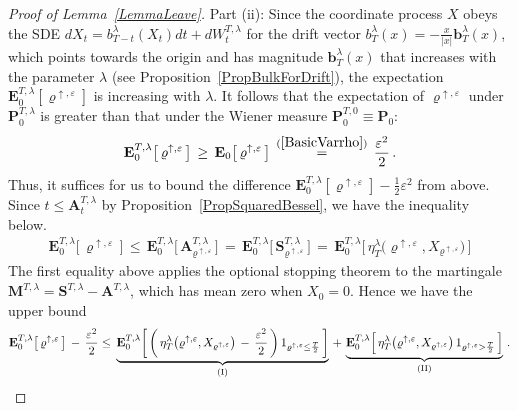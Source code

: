 \documentclass[10pt]{article}
\def\stackrel#1#2{\mathrel{\mathop{#2}\limits^{#1}}}
\numberwithin{equation}{section}
\theoremstyle{definition}
\begin{document}
\begin{proof}[Proof of Lemma~\ref{LemmaLeave}]
\noindent Part (ii): Since the coordinate process $X$ obeys the SDE $dX_t=b_{T-t}^{\lambda}(X_t)dt+dW_t^{T,\lambda}$ for the drift vector $b_{T}^{\lambda}(x)=-\frac{x}{|x|}\mathbf{b}_{T}^{\lambda}(x)$, which points towards the origin and has magnitude $\mathbf{b}_{T}^{\lambda}(x)$ that increases with the parameter $\lambda$ (see Proposition~\ref{PropBulkForDrift}), the expectation $\mathbf{E}_{0}^{T,\lambda}[ \varrho^{\uparrow, \varepsilon} ]$ is increasing with $\lambda$.  It follows that the expectation of $ \varrho^{\uparrow, \varepsilon}$ under  $\mathbf{P}_{0}^{T,\lambda}$ is greater than that under the Wiener measure $\mathbf{P}_{0}^{T,0}\equiv \mathbf{P}_{0} $:
$$\mathbf{E}_{0}^{T,\lambda}\big[ \,\varrho^{\uparrow, \varepsilon} \,\big] \,\geq \,\mathbf{E}_{0}\big[\, \varrho^{\uparrow, \varepsilon} \,\big] \,\stackrel{(\ref{BasicVarrho})}{=}\,\frac{\varepsilon^2}{2}\,. $$
 Thus, it suffices for us to bound the difference $\mathbf{E}_{0}^{T,\lambda}[ \varrho^{\uparrow, \varepsilon} ]-\frac{1}{2}\varepsilon^2$ from above.  
 Since $t \leq \mathbf{A}_{t }^{T,\lambda}  $ by  Proposition~\ref{PropSquaredBessel}, we have the inequality below. 
\begin{align*}
    \mathbf{E}_{0}^{T,\lambda }\big[\, \varrho^{\uparrow, \varepsilon}\, \big] \,\leq \,   \mathbf{E}_{0}^{T,\lambda }\Big[\,\mathbf{A}_{\varrho^{\uparrow, \varepsilon} }^{T,\lambda} \, \Big] \,=\, \mathbf{E}_{0}^{T,\lambda}\Big[\, \mathbf{S}_{\varrho^{\uparrow, \varepsilon} }^{T,\lambda}  \,\Big]\,=\,\mathbf{E}_{0}^{T,\lambda}\Big[\,\eta_{T}^{\lambda}\big(\varrho^{\uparrow, \varepsilon}, X_{\varrho^{\uparrow, \varepsilon}}\big) \,\Big]
\end{align*}
The first equality above applies the optional stopping theorem to the martingale $\mathbf{M}^{T,\lambda}=\mathbf{S}^{T,\lambda}-\mathbf{A}^{T,\lambda} $, which has mean zero when $X_0=0$.  Hence we have the upper bound
\begin{align*}
     \mathbf{E}_{0}^{T,\lambda}\big[ \,\varrho^{\uparrow, \varepsilon} \,\big]\,-\, \frac{\varepsilon^2 }{2}
   \leq   \,\underbrace{\mathbf{E}_{0}^{T,\lambda}\bigg[\,\bigg(\,\eta_{T}^{\lambda}\big(\varrho^{\uparrow, \varepsilon}, X_{\varrho^{\uparrow, \varepsilon}}\big) \,-\, \frac{\varepsilon^2}{2}\,\bigg) \,1_{ \varrho^{\uparrow, \varepsilon}\leq \frac{T}{2}   } \,\bigg]}_{\textup{(I)}}   \,+\,  \underbrace{\mathbf{E}_{0}^{T,\lambda}\Big[\,\eta_{T}^{\lambda}\big(\varrho^{\uparrow, \varepsilon}, X_{\varrho^{\uparrow, \varepsilon}}\big)\, 1_{ \varrho^{\uparrow, \varepsilon} > \frac{T}{2}  }\,\Big]}_{\textup{(II)}} \,.

\end{align*}
\end{proof}
\end{document}
